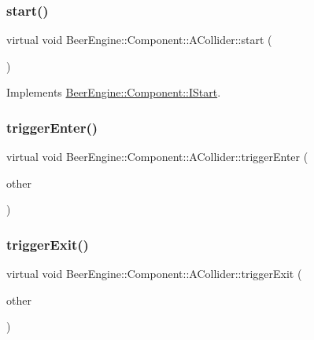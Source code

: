 \subsubsection{\texorpdfstring{start()}{start()}}
{\footnotesize\ttfamily virtual void Beer\+Engine\+::\+Component\+::\+A\+Collider\+::start (\begin{DoxyParamCaption}\item[{void}]{ }\end{DoxyParamCaption})\hspace{0.3cm}{\ttfamily [virtual]}}



Implements \mbox{\hyperlink{class_beer_engine_1_1_component_1_1_i_start_aa3e25e86e20c46cdaefc6f6d7f21e495}{Beer\+Engine\+::\+Component\+::\+I\+Start}}.

\mbox{\label{class_beer_engine_1_1_component_1_1_a_collider_a9ae412a0e4650848a0ce539aa05b1c6a}} 
\subsubsection{\texorpdfstring{trigger\+Enter()}{triggerEnter()}}
{\footnotesize\ttfamily virtual void Beer\+Engine\+::\+Component\+::\+A\+Collider\+::trigger\+Enter (\begin{DoxyParamCaption}\item[{\mbox{\hyperlink{class_beer_engine_1_1_component_1_1_a_collider}{A\+Collider}} $\ast$}]{other }\end{DoxyParamCaption})\hspace{0.3cm}{\ttfamily [virtual]}}

\mbox{\label{class_beer_engine_1_1_component_1_1_a_collider_aef3fe6dd09a0959ab496f2eaaa5d0491}} 
\subsubsection{\texorpdfstring{trigger\+Exit()}{triggerExit()}}
{\footnotesize\ttfamily virtual void Beer\+Engine\+::\+Component\+::\+A\+Collider\+::trigger\+Exit (\begin{DoxyParamCaption}\item[{\mbox{\hyperlink{class_beer_engine_1_1_component_1_1_a_collider}{A\+Collider}} $\ast$}]{other }\end{DoxyParamCaption})\hspace{0.3cm}{\ttfamily [virtual]}}

